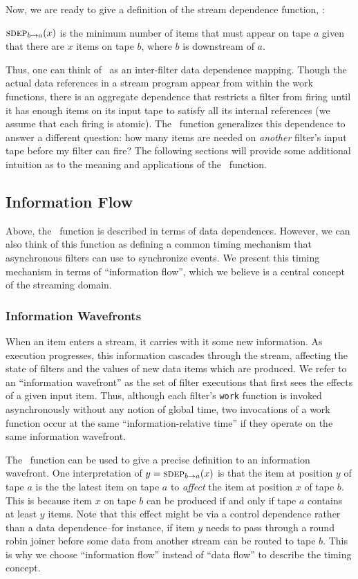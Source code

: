 Now, we are ready to give a definition of the stream dependence
function, \sdep:
\begin{definition}
$\mi{a}{b}(x)$ is the minimum number of items that must appear on tape
 $a$ given that there are $x$ items on tape $b$, where $b$ is
downstream of $a$.
\end{definition}
Thus, one can think of \sdep~as an inter-filter data dependence
mapping.  Though the actual data references in a stream program appear
from within the work functions, there is an aggregate dependence that
restricts a filter from firing until it has enough items on its input
tape to satisfy all its internal references (we assume that each
firing is atomic).  The \sdep~function generalizes this dependence to
answer a different question: how many items are needed on {\it
another} filter's input tape before my filter can fire?  The following
sections will provide some additional intuition as to the meaning and
applications of the \sdep~function.

\subsection{Information Flow}
\label{sec:informationflow}

Above, the \sdep~function is described in terms of data dependences.
However, we can also think of this function as defining a common
timing mechanism that asynchronous filters can use to synchronize
events.  We present this timing mechanism in terms of ``information
flow'', which we believe is a central concept of the streaming domain.

\subsubsection{Information Wavefronts}

When an item enters a stream, it carries with it some new information.
As execution progresses, this information cascades through the stream,
affecting the state of filters and the values of new data items which
are produced.  We refer to an ``information wavefront'' as the set of
filter executions that first sees the effects of a given input item.
Thus, although each filter's {\tt work} function is invoked
asynchronously without any notion of global time, two invocations of a
work function occur at the same ``information-relative time'' if they
operate on the same information wavefront.

The \sdep~function can be used to give a precise definition to an
information wavefront.  One interpretation of $y = \mi{a}{b}(x)$ is
that the item at position $y$ of tape $a$ is the the latest item on
tape $a$ to {\it affect} the item at position $x$ of tape $b$.  This
is because item $x$ on tape $b$ can be produced if and only if tape
$a$ contains at least $y$ items.  Note that this effect might be via a
control dependence rather than a data dependence--for instance, if
item $y$ needs to pass through a round robin joiner before some data
from another stream can be routed to tape $b$.  This is why we choose
``information flow'' instead of ``data flow'' to describe the timing
concept.

